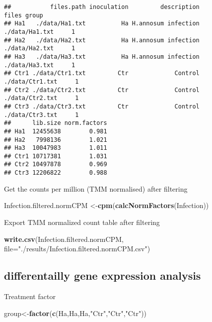 \documentclass[
]{article}
\newenvironment{Shaded}{\begin{snugshade}}{\end{snugshade}}
\newcommand{\AttributeTok}[1]{\textcolor[rgb]{0.13,0.29,0.53}{#1}}
\newcommand{\FunctionTok}[1]{\textcolor[rgb]{0.13,0.29,0.53}{\textbf{#1}}}
\newcommand{\NormalTok}[1]{#1}
\newcommand{\OtherTok}[1]{\textcolor[rgb]{0.56,0.35,0.01}{#1}}
\newcommand{\StringTok}[1]{\textcolor[rgb]{0.31,0.60,0.02}{#1}}
\begin{document}
\begin{verbatim}
##           files.path inoculation         description           files group
## Ha1   ./data/Ha1.txt          Ha H.annosum infection  ./data/Ha1.txt     1
## Ha2   ./data/Ha2.txt          Ha H.annosum infection  ./data/Ha2.txt     1
## Ha3   ./data/Ha3.txt          Ha H.annosum infection  ./data/Ha3.txt     1
## Ctr1 ./data/Ctr1.txt         Ctr             Control ./data/Ctr1.txt     1
## Ctr2 ./data/Ctr2.txt         Ctr             Control ./data/Ctr2.txt     1
## Ctr3 ./data/Ctr3.txt         Ctr             Control ./data/Ctr3.txt     1
##      lib.size norm.factors
## Ha1  12455638        0.981
## Ha2   7998136        1.021
## Ha3  10047983        1.011
## Ctr1 10717381        1.031
## Ctr2 10497878        0.969
## Ctr3 12206822        0.988
\end{verbatim}

Get the counts per million (TMM normalised) after filtering

\begin{Shaded}
\begin{Highlighting}[]
\NormalTok{Infection.filtered.normCPM }\OtherTok{\textless{}{-}}\FunctionTok{cpm}\NormalTok{(}\FunctionTok{calcNormFactors}\NormalTok{(Infection))}
\end{Highlighting}
\end{Shaded}

Export TMM normalized count table after filtering

\begin{Shaded}
\begin{Highlighting}[]
\FunctionTok{write.csv}\NormalTok{(Infection.filtered.normCPM, }\AttributeTok{file=}\StringTok{"./results/Infection.filtered.normCPM.csv"}\NormalTok{)}
\end{Highlighting}
\end{Shaded}

\subsection{differentailly gene expression
analysis}\label{differentailly-gene-expression-analysis}

Treatment factor

\begin{Shaded}
\begin{Highlighting}[]
\NormalTok{group}\OtherTok{\textless{}{-}}\FunctionTok{factor}\NormalTok{(}\FunctionTok{c}\NormalTok{(}\StringTok{\textquotesingle{}Ha\textquotesingle{}}\NormalTok{,}\StringTok{\textquotesingle{}Ha\textquotesingle{}}\NormalTok{,}\StringTok{\textquotesingle{}Ha\textquotesingle{}}\NormalTok{,}\StringTok{"Ctr"}\NormalTok{,}\StringTok{"Ctr"}\NormalTok{,}\StringTok{"Ctr"}\NormalTok{))}
\end{Highlighting}
\end{Shaded}
\end{document}
